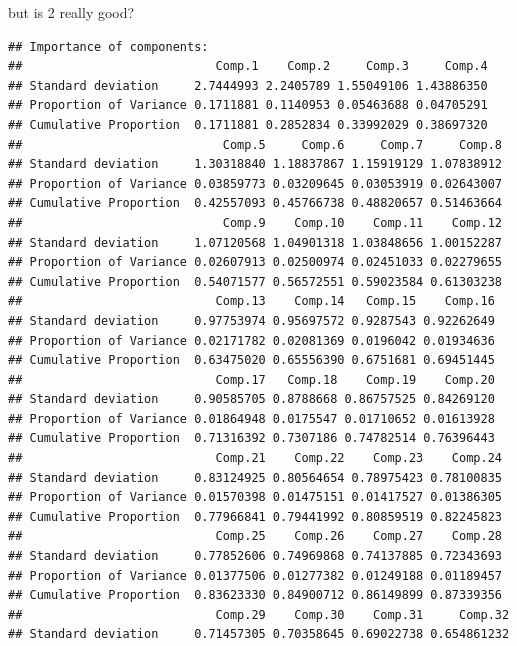 \begin{frame}[fragile]{but is 2 really good?}
  
  {\scriptsize
\begin{knitrout}
\color{fgcolor}\begin{kframe}
\begin{alltt}
\end{alltt}
\begin{verbatim}
## Importance of components:
##                           Comp.1    Comp.2     Comp.3     Comp.4
## Standard deviation     2.7444993 2.2405789 1.55049106 1.43886350
## Proportion of Variance 0.1711881 0.1140953 0.05463688 0.04705291
## Cumulative Proportion  0.1711881 0.2852834 0.33992029 0.38697320
##                            Comp.5     Comp.6     Comp.7     Comp.8
## Standard deviation     1.30318840 1.18837867 1.15919129 1.07838912
## Proportion of Variance 0.03859773 0.03209645 0.03053919 0.02643007
## Cumulative Proportion  0.42557093 0.45766738 0.48820657 0.51463664
##                            Comp.9    Comp.10    Comp.11    Comp.12
## Standard deviation     1.07120568 1.04901318 1.03848656 1.00152287
## Proportion of Variance 0.02607913 0.02500974 0.02451033 0.02279655
## Cumulative Proportion  0.54071577 0.56572551 0.59023584 0.61303238
##                           Comp.13    Comp.14   Comp.15    Comp.16
## Standard deviation     0.97753974 0.95697572 0.9287543 0.92262649
## Proportion of Variance 0.02171782 0.02081369 0.0196042 0.01934636
## Cumulative Proportion  0.63475020 0.65556390 0.6751681 0.69451445
##                           Comp.17   Comp.18    Comp.19    Comp.20
## Standard deviation     0.90585705 0.8788668 0.86757525 0.84269120
## Proportion of Variance 0.01864948 0.0175547 0.01710652 0.01613928
## Cumulative Proportion  0.71316392 0.7307186 0.74782514 0.76396443
##                           Comp.21    Comp.22    Comp.23    Comp.24
## Standard deviation     0.83124925 0.80564654 0.78975423 0.78100835
## Proportion of Variance 0.01570398 0.01475151 0.01417527 0.01386305
## Cumulative Proportion  0.77966841 0.79441992 0.80859519 0.82245823
##                           Comp.25    Comp.26    Comp.27    Comp.28
## Standard deviation     0.77852606 0.74969868 0.74137885 0.72343693
## Proportion of Variance 0.01377506 0.01277382 0.01249188 0.01189457
## Cumulative Proportion  0.83623330 0.84900712 0.86149899 0.87339356
##                           Comp.29    Comp.30    Comp.31     Comp.32
## Standard deviation     0.71457305 0.70358645 0.69022738 0.654861232

\end{verbatim}
\end{kframe}
\end{knitrout}}
\end{frame}
